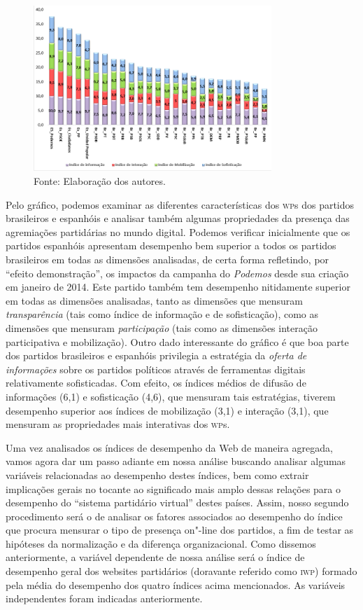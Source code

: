 \begin{figure}[!ht]
\centering
 \includegraphics[width=90mm]{./imgs/graf1.png}
\caption{Fonte: Elaboração dos autores.}
\end{figure}

Pelo gráfico, podemos examinar as diferentes características dos \textsc{wp}s dos
partidos brasileiros e espanhóis e analisar também algumas propriedades
da presença das agremiações partidárias no mundo digital. Podemos
verificar inicialmente que os partidos espanhóis apresentam desempenho
bem superior a todos os partidos brasileiros em todas as dimensões
analisadas, de certa forma refletindo, por ``efeito demonstração'', os
impactos da campanha do \emph{Podemos} desde sua criação em janeiro de
2014. Este partido também tem desempenho nitidamente superior em todas
as dimensões analisadas, tanto as dimensões que mensuram
\emph{transparência} (tais como índice de informação e de sofisticação),
como as dimensões que mensuram \emph{participação} (tais como as
dimensões interação participativa e mobilização). Outro dado
interessante do gráfico é que boa parte dos partidos brasileiros e
espanhóis privilegia a estratégia da \emph{oferta de informações} sobre
os partidos políticos através de ferramentas digitais relativamente
sofisticadas. Com efeito, os índices médios de difusão de informações
(6,1) e sofisticação (4,6), que mensuram tais estratégias, tiverem
desempenho superior aos índices de mobilização (3,1) e interação (3,1),
que mensuram as propriedades mais interativas dos \textsc{wp}s.

Uma vez analisados os índices de desempenho da Web de maneira agregada,
vamos agora dar um passo adiante em nossa análise buscando analisar
algumas variáveis relacionadas ao desempenho destes índices, bem como
extrair implicações gerais no tocante ao significado mais amplo dessas
relações para o desempenho do ``sistema partidário virtual'' destes
países. Assim, nosso segundo procedimento será o de analisar os fatores
associados ao desempenho do índice que procura mensurar o tipo de
presença on"-line dos partidos, a fim de testar as hipóteses da
normalização e da diferença organizacional. Como dissemos anteriormente,
a variável dependente de nossa análise será o índice de desempenho geral
dos websites partidários (doravante referido como \textsc{iwp}) formado pela
média do desempenho dos quatro índices acima mencionados. As variáveis
independentes foram indicadas anteriormente.

